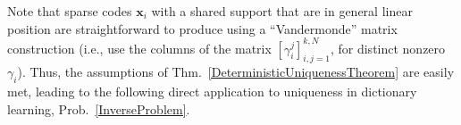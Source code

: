 \documentclass[9pt,twocolumn]{pnas-new}
\renewcommand{\eqref}[1]{\textnormal{[\ref{#1}]}}
\begin{document}
Note that sparse codes $\mathbf{x}_i$ with a shared support that are in general linear position are straightforward to produce using a ``Vandermonde'' matrix construction (i.e., use the columns of the matrix $[\gamma_{i}^j]_{i,j=1}^{k,N}$, for distinct nonzero $\gamma_i$).  Thus, the assumptions of Thm.~\ref{DeterministicUniquenessTheorem} are easily met, leading to the following direct application to uniqueness in dictionary learning, Prob.~\ref{InverseProblem}.
%
%
%
\end{document}
